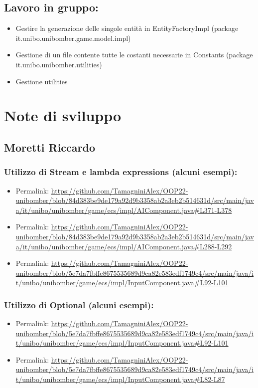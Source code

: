 \documentclass[a4paper,12pt]{report}
\begin{document}
\subsection*{Lavoro in gruppo:}
\begin{itemize}
    \item Gestire la generazione delle singole entità in EntityFactoryImpl (package it.unibo.unibomber.game.model.impl)
    \item Gestione di un file contente tutte le costanti necessarie in Constants (package it.unibo.unibomber.utilities)
    \item Gestione utilities
\end{itemize}

\section{Note di sviluppo}
\subsection*{Moretti Riccardo}
\subsubsection*{Utilizzo di Stream e lambda expressions (alcuni esempi):}
\begin{itemize}
    \item Permalink: \url{https://github.com/TamagniniAlex/OOP22-unibomber/blob/84d383be9de179a92d9b3358ab2a3eb2b514631d/src/main/java/it/unibo/unibomber/game/ecs/impl/AIComponent.java#L371-L378}
    \item Permalink: \url{https://github.com/TamagniniAlex/OOP22-unibomber/blob/84d383be9de179a92d9b3358ab2a3eb2b514631d/src/main/java/it/unibo/unibomber/game/ecs/impl/AIComponent.java#L288-L292}
    \item Permalink: \url{https://github.com/TamagniniAlex/OOP22-unibomber/blob/5e7da7fbffe8675535689d9ca82e583edf1749c4/src/main/java/it/unibo/unibomber/game/ecs/impl/InputComponent.java#L92-L101}
\end{itemize}
\subsubsection*{Utilizzo di Optional (alcuni esempi):}
\begin{itemize}
    \item Permalink: \url{https://github.com/TamagniniAlex/OOP22-unibomber/blob/5e7da7fbffe8675535689d9ca82e583edf1749c4/src/main/java/it/unibo/unibomber/game/ecs/impl/InputComponent.java#L92-L101}
    \item Permalink: \url{https://github.com/TamagniniAlex/OOP22-unibomber/blob/5e7da7fbffe8675535689d9ca82e583edf1749c4/src/main/java/it/unibo/unibomber/game/ecs/impl/InputComponent.java#L82-L87}
\end{itemize}
\end{document}
